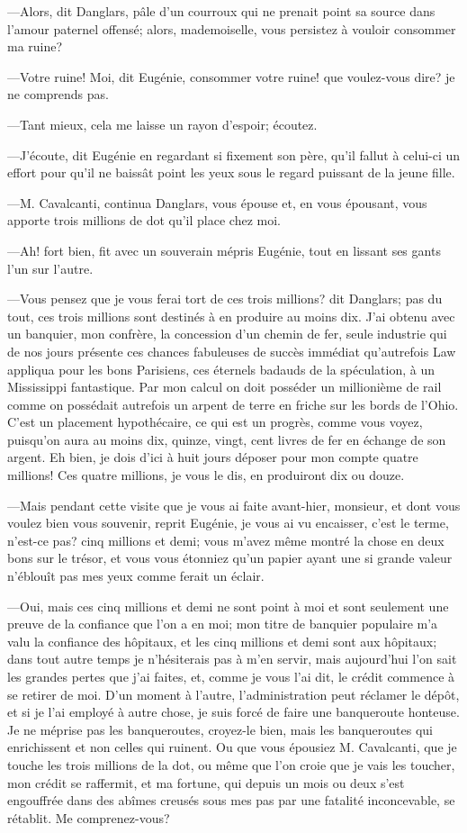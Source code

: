—Alors, dit Danglars, pâle d'un courroux qui ne prenait point sa source dans l'amour paternel offensé; alors, mademoiselle, vous persistez à vouloir consommer ma ruine? 

—Votre ruine! Moi, dit Eugénie, consommer votre ruine! que voulez-vous dire? je ne comprends pas. 

—Tant mieux, cela me laisse un rayon d'espoir; écoutez. 

—J'écoute, dit Eugénie en regardant si fixement son père, qu'il fallut à celui-ci un effort pour qu'il ne baissât point les yeux sous le regard puissant de la jeune fille. 

—M. Cavalcanti, continua Danglars, vous épouse et, en vous épousant, vous apporte trois millions de dot qu'il place chez moi. 

—Ah! fort bien, fit avec un souverain mépris Eugénie, tout en lissant ses gants l'un sur l'autre. 

—Vous pensez que je vous ferai tort de ces trois millions? dit Danglars; pas du tout, ces trois millions sont destinés à en produire au moins dix. J'ai obtenu avec un banquier, mon confrère, la concession d'un chemin de fer, seule industrie qui de nos jours présente ces chances fabuleuses de succès immédiat qu'autrefois Law appliqua pour les bons Parisiens, ces éternels badauds de la spéculation, à un Mississippi fantastique. Par mon calcul on doit posséder un millionième de rail comme on possédait autrefois un arpent de terre en friche sur les bords de l'Ohio. C'est un placement hypothécaire, ce qui est un progrès, comme vous voyez, puisqu'on aura au moins dix, quinze, vingt, cent livres de fer en échange de son argent. Eh bien, je dois d'ici à huit jours déposer pour mon compte quatre millions! Ces quatre millions, je vous le dis, en produiront dix ou douze. 

—Mais pendant cette visite que je vous ai faite avant-hier, monsieur, et dont vous voulez bien vous souvenir, reprit Eugénie, je vous ai vu encaisser, c'est le terme, n'est-ce pas? cinq millions et demi; vous m'avez même montré la chose en deux bons sur le trésor, et vous vous étonniez qu'un papier ayant une si grande valeur n'éblouît pas mes yeux comme ferait un éclair. 

—Oui, mais ces cinq millions et demi ne sont point à moi et sont seulement une preuve de la confiance que l'on a en moi; mon titre de banquier populaire m'a valu la confiance des hôpitaux, et les cinq millions et demi sont aux hôpitaux; dans tout autre temps je n'hésiterais pas à m'en servir, mais aujourd'hui l'on sait les grandes pertes que j'ai faites, et, comme je vous l'ai dit, le crédit commence à se retirer de moi. D'un moment à l'autre, l'administration peut réclamer le dépôt, et si je l'ai employé à autre chose, je suis forcé de faire une banqueroute honteuse. Je ne méprise pas les banqueroutes, croyez-le bien, mais les banqueroutes qui enrichissent et non celles qui ruinent. Ou que vous épousiez M. Cavalcanti, que je touche les trois millions de la dot, ou même que l'on croie que je vais les toucher, mon crédit se raffermit, et ma fortune, qui depuis un mois ou deux s'est engouffrée dans des abîmes creusés sous mes pas par une fatalité inconcevable, se rétablit. Me comprenez-vous? 

